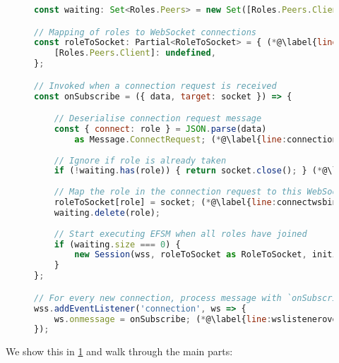 \begin{figure}[!h]
\begin{lstlisting}[language=javascript,tabsize=2]
const waiting: Set<Roles.Peers> = new Set([Roles.Peers.Client]); (*@\label{line:initwaiting}@*)

// Mapping of roles to WebSocket connections
const roleToSocket: Partial<RoleToSocket> = { (*@\label{line:initroletosocket}@*)
	[Roles.Peers.Client]: undefined,
};

// Invoked when a connection request is received
const onSubscribe = ({ data, target: socket }) => {

	// Deserialise connection request message
	const { connect: role } = JSON.parse(data) 
		as Message.ConnectRequest; (*@\label{line:connectionrequest}@*)
		
	// Ignore if role is already taken
	if (!waiting.has(role)) { return socket.close(); } (*@\label{line:occupied}@*)
	
	// Map the role in the connection request to this WebSocket
	roleToSocket[role] = socket; (*@\label{line:connectwsbind}@*)
	waiting.delete(role);
	
	// Start executing EFSM when all roles have joined
	if (waiting.size === 0) {
		new Session(wss, roleToSocket as RoleToSocket, initialState); (*@\label{line:newsession}@*)
	}
};

// For every new connection, process message with `onSubscribe`
wss.addEventListener('connection', ws => {
	ws.onmessage = onSubscribe; (*@\label{line:wslisteneroverride}@*)
});
\end{lstlisting}
\label{lst:nodeconnect}
\end{figure}

We show this in \cref{lst:nodeconnect} and walk through
the main parts:

